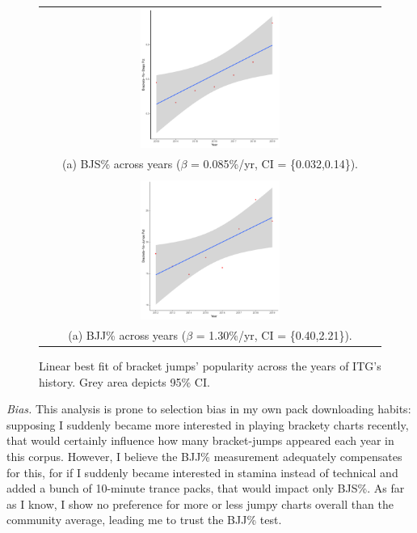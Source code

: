 \documentclass[10pt]{sigplanconf}
\begin{document}
\begin{figure}[t]
	\begin{tabular}{c}
		\includegraphics[width=0.42\textwidth]{step_plot.pdf}
		\\
		(a) BJS\% across years ($\beta$ = 0.085\%/yr, CI = \{0.032,0.14\}).
		\\
		\\
		\includegraphics[width=0.42\textwidth]{jump_plot.pdf}
		\\
		(a) BJJ\% across years ($\beta$ = 1.30\%/yr, CI = \{0.40,2.21\}).
	\end{tabular}
	\caption{Linear best fit of bracket jumps' popularity across the years of ITG's history.
	Grey area depicts 95\% CI.}
	\label{fig:stats}
\end{figure}

\textit{Bias.}
This analysis is prone to selection bias in my own pack downloading habits:
supposing I suddenly became more interested in playing brackety charts recently,
that would certainly influence how many bracket-jumps appeared each year in this corpus.
However, I believe the BJJ\% measurement adequately compensates for this,
for if I suddenly became interested in stamina instead of technical and added a bunch of 10-minute trance packs,
that would impact only BJS\%.
As far as I know, I show no preference for more or less jumpy charts overall than the community average,
leading me to trust the BJJ\% test.
\end{document}
